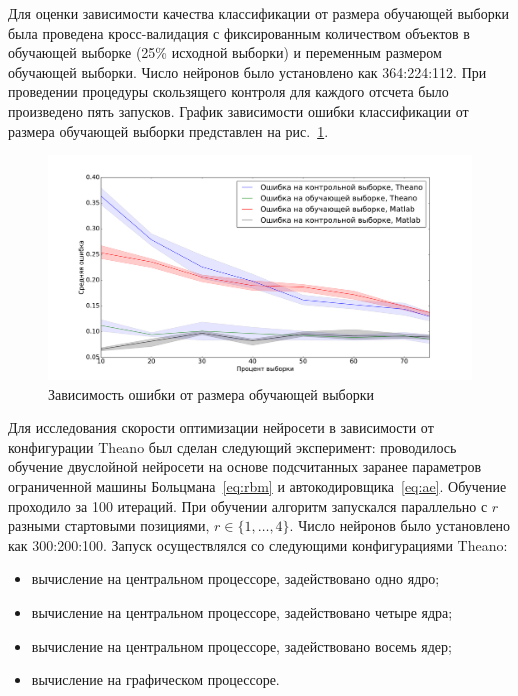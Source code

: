Для оценки зависимости качества классификации от размера обучающей выборки была проведена кросс-валидация с фиксированным количеством объектов в обучающей выборке (25\% исходной выборки) и переменным размером обучающей выборки. Число нейронов было установлено как 364:224:112. При проведении процедуры скользящего контроля для каждого отсчета было произведено пять запусков. График зависимости ошибки классификации от размера обучающей выборки представлен на рис.~\ref{fig:samples}.


\begin{figure}[tb!]
 \centering
  \includegraphics[width=1.0\textwidth]{plots/popova/samples.pdf}
 \caption{Зависимость ошибки от размера обучающей выборки}
 \label{fig:samples}
\end{figure}


Для исследования скорости оптимизации нейросети в зависимости от конфигурации Theano был сделан следующий эксперимент:
проводилось обучение двуслойной нейросети на основе подсчитанных заранее параметров ограниченной машины Больцмана~\eqref{eq:rbm} и автокодировщика~\eqref{eq:ae}. Обучение проходило за 100 итераций. При обучении алгоритм запускался параллельно с $r$ разными стартовыми позициями, $r \in \{1,\dots,4\}.$ Число нейронов было установлено как 300:200:100.
Запуск осуществлялся со следующими конфигурациями Theano:
\begin{itemize}
\item вычисление на центральном процессоре, задействовано
одно ядро;
\item вычисление на центральном процессоре, задействовано четыре ядра;
\item вычисление на центральном процессоре, задействовано восемь ядер;
\item вычисление на графическом процессоре.
\end{itemize}

